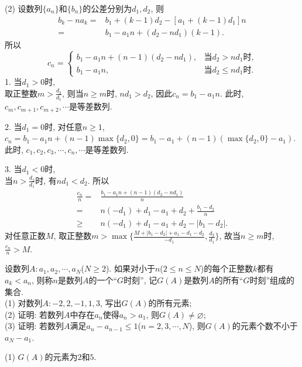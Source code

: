 \documentclass[green]{lsbook}
\begin{document}
(2) 设数列$\{a_n\}$和$\{b_n\}$的公差分别为$d_1,d_2$, 则
\begin{align*}
b_k-na_k=&b_1+(k-1)d_2-[a_1+(k-1)d_1]n\\
=&b_1-a_1n+(d_2-nd_1)(k-1).
\end{align*}
所以\[c_n=
\begin{cases}
	b_1-a_1n+(n-1)(d_2-nd_1), &\text{当$d_2>nd_1$时,}\\
	b_1-a_1n,&\text{当$d_2\leq nd_1$时.}
\end{cases}\]
1. 当$d_1>0$时,\\ 
取正整数$m>\frac{d_2}{d_1}$, 则当$n\geq m$时, $nd_1>d_2$, 因此$c_n=b_1-a_1n$. 
此时, $c_m,c_{m+1},c_{m+2},\cdots$是等差数列.

2. 当$d_1=0$时, 对任意$n\geq 1$,\\ 
$c_n=b_1-a_1n+(n-1)\max \{d_2,0\}=b_1-a_1+(n-1)(\max \{d_2,0\}-a_1)$. \\
此时, $c_1,c_2,c_3,\cdots,c_n,\cdots$是等差数列. 

3. 当$d_1<0$时, \\
当$n>\frac{d_2}{d_1}$时, 有$nd_1<d_2$. 所以
\begin{align*}
\frac{c_n}{n}=&\frac{b_1-a_1n+(n-1)(d_2-nd_1)}{n}\\
=&n(-d_1)+d_1-a_1+d_2+\frac{b_1-d_2}{n}\\
\geq& n(-d_1)+d_1-a_1+d_2-|b_1-d_2|. 
\end{align*}
对任意正数$M$, 取正整数$m>\max\{\frac{M+|b_1-d_2|+a_1-d_1-d_2}{-d_1},\frac{d_2}{d_1}\}$, 
故当$n\geq m$时, $\frac{c_n}{n}>M$. 


\newpage


\begin{tcolorbox}[applelight,title={2016.20(本小题13分)}]
设数列$A\colon a_1, a_2,\cdots, a_N$($N\geq 2$). 如果对小于$n$($2\leq n\leq N$)的每个正整数$k$都有$a_k<a_n$, 则称$n$是数列$A$的一个“$G$时刻”, 记$G(A)$是数列$A$的所有“$G$时刻”组成的集合.\\
 (1) 对数列$A\colon -2,2,-1,1,3$, 写出$G(A)$的所有元素;\\ 
 (2) 证明: 若数列$A$中存在$a_n$使得$a_n>a_1$, 则$G(A)\neq \varnothing$;\\
 (3) 证明: 若数列$A$满足$a_n-a_{n-1}\leq 1$($n=2,3,\cdots,N$), 则$G(A)$的元素个数不小于$a_N-a_1$.
\end{tcolorbox}


(1) $G(A)$的元素为$2$和$5$. 
\end{document}
